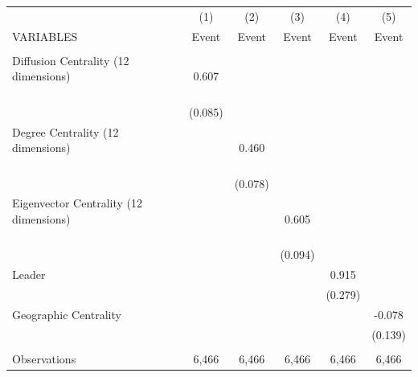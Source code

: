 \begin{tabular}{lccccc} \hline
 & (1) & (2) & (3) & (4) & (5) \\
VARIABLES & Event & Event & Event & Event & Event \\ \hline
 &  &  &  &  &  \\
Diffusion Centrality (12 dimensions) \ \ \ \ \ \ \ \ \ \ \ \ \ \ \ \ \ \ \ \ \ \ & 0.607 &  &  &  &  \\
 & (0.085) &  &  &  &  \\
Degree Centrality (12 dimensions) \ \ \ \ \ \ \ \ \ \ \ \ \ \ \ \ \ \ \ \ \ \ \ &  & 0.460 &  &  &  \\
 &  & (0.078) &  &  &  \\
Eigenvector Centrality (12 dimensions) \ \ \ \ \ \ \ \ \ \ \ \ \ \ \ \ \ \ \ \ \ &  &  & 0.605 &  &  \\
 &  &  & (0.094) &  &  \\
Leader &  &  &  & 0.915 &  \\
 &  &  &  & (0.279) &  \\
Geographic Centrality &  &  &  &  & -0.078 \\
 &  &  &  &  & (0.139) \\
 &  &  &  &  &  \\
 Observations & 6,466 & 6,466 & 6,466 & 6,466 & 6,466 \\ \hline
\end{tabular}
